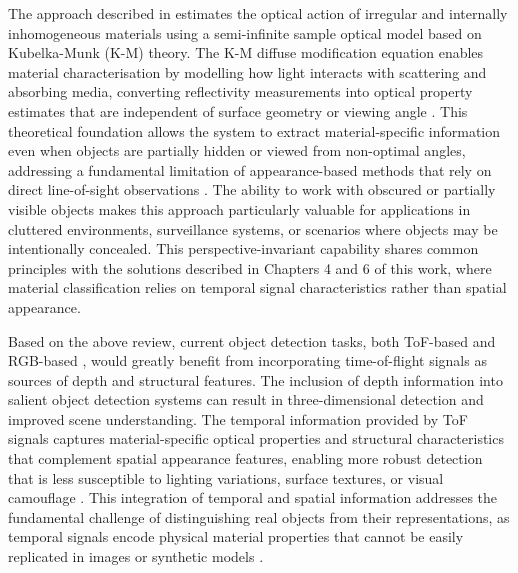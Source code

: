 \documentclass[12pt,a4paper,oneside]{report}
\begin{document}
The approach described in \cite{yang2024} estimates the optical action of irregular and internally inhomogeneous materials using a semi-infinite sample optical model based on Kubelka-Munk (K-M) theory. The K-M diffuse modification equation enables material characterisation by modelling how light interacts with scattering and absorbing media, converting reflectivity measurements into optical property estimates that are independent of surface geometry or viewing angle \cite{elachi2021,bass2010}. This theoretical foundation allows the system to extract material-specific information even when objects are partially hidden or viewed from non-optimal angles, addressing a fundamental limitation of appearance-based methods that rely on direct line-of-sight observations \cite{schwartz2013,sharan2013}. The ability to work with obscured or partially visible objects makes this approach particularly valuable for applications in cluttered environments, surveillance systems, or scenarios where objects may be intentionally concealed. This perspective-invariant capability shares common principles with the solutions described in Chapters 4 and 6 of this work, where material classification relies on temporal signal characteristics rather than spatial appearance.

Based on the above review, current object detection tasks, both ToF-based \cite{tafone2023,fasolino2024,yang2023} and RGB-based \cite{chen2024}, would greatly benefit from incorporating time-of-flight signals as sources of depth and structural features. The inclusion of depth information into salient object detection systems \cite{chen2024} can result in three-dimensional detection and improved scene understanding. The temporal information provided by ToF signals captures material-specific optical properties and structural characteristics that complement spatial appearance features, enabling more robust detection that is less susceptible to lighting variations, surface textures, or visual camouflage \cite{su2016,becker2023,tafone2023}. This integration of temporal and spatial information addresses the fundamental challenge of distinguishing real objects from their representations, as temporal signals encode physical material properties that cannot be easily replicated in images or synthetic models \cite{su2016}.
\end{document}
